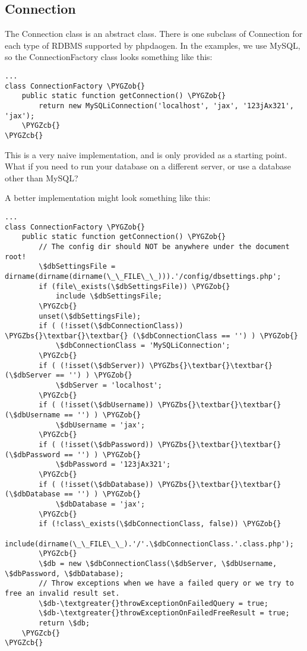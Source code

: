 \documentclass[letterpaper,10pt,english]{sphinxmanual}
\def\PYGZbs{\char`\\}
\def\PYGZob{\char`\{}
\def\PYGZcb{\char`\}}
\begin{document}
\subsection{Connection}
\label{jaxFrameworkGuide:connection}
The Connection class is an abstract class.  There is one subclass of Connection for each type of
RDBMS supported by phpdaogen.  In the examples, we use MySQL, so the ConnectionFactory class looks
something like this:

\begin{Verbatim}[commandchars=\\\{\}]
...
class ConnectionFactory \PYGZob{}
    public static function getConnection() \PYGZob{}
        return new MySQLiConnection('localhost', 'jax', '123jAx321', 'jax');
    \PYGZcb{}
\PYGZcb{}
\end{Verbatim}

This is a very naive implementation, and is only provided as a starting point.  What if you need to
run your database on a different server, or use a database other than MySQL?

A better implementation might look something like this:

\begin{Verbatim}[commandchars=\\\{\}]
...
class ConnectionFactory \PYGZob{}
    public static function getConnection() \PYGZob{}
        // The config dir should NOT be anywhere under the document root!
        \$dbSettingsFile = dirname(dirname(dirname(\_\_FILE\_\_))).'/config/dbsettings.php';
        if (file\_exists(\$dbSettingsFile)) \PYGZob{}
            include \$dbSettingsFile;
        \PYGZcb{}
        unset(\$dbSettingsFile);
        if ( (!isset(\$dbConnectionClass)) \PYGZbs{}\textbar{}\textbar{} (\$dbConnectionClass == '') ) \PYGZob{}
            \$dbConnectionClass = 'MySQLiConnection';
        \PYGZcb{}
        if ( (!isset(\$dbServer)) \PYGZbs{}\textbar{}\textbar{} (\$dbServer == '') ) \PYGZob{}
            \$dbServer = 'localhost';
        \PYGZcb{}
        if ( (!isset(\$dbUsername)) \PYGZbs{}\textbar{}\textbar{} (\$dbUsername == '') ) \PYGZob{}
            \$dbUsername = 'jax';
        \PYGZcb{}
        if ( (!isset(\$dbPassword)) \PYGZbs{}\textbar{}\textbar{} (\$dbPassword == '') ) \PYGZob{}
            \$dbPassword = '123jAx321';
        \PYGZcb{}
        if ( (!isset(\$dbDatabase)) \PYGZbs{}\textbar{}\textbar{} (\$dbDatabase == '') ) \PYGZob{}
            \$dbDatabase = 'jax';
        \PYGZcb{}
        if (!class\_exists(\$dbConnectionClass, false)) \PYGZob{}
            include(dirname(\_\_FILE\_\_).'/'.\$dbConnectionClass.'.class.php');
        \PYGZcb{}
        \$db = new \$dbConnectionClass(\$dbServer, \$dbUsername, \$dbPassword, \$dbDatabase);
        // Throw exceptions when we have a failed query or we try to free an invalid result set.
        \$db-\textgreater{}throwExceptionOnFailedQuery = true;
        \$db-\textgreater{}throwExceptionOnFailedFreeResult = true;
        return \$db;
    \PYGZcb{}
\PYGZcb{}
\end{Verbatim}
\end{document}
